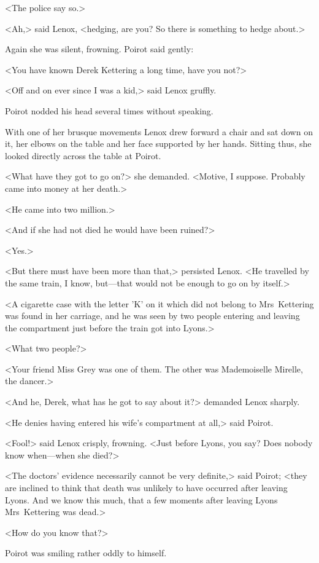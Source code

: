 <The police say so.>

<Ah,> said Lenox, <hedging, are you? So there is something to hedge about.>

Again she was silent, frowning. Poirot said gently:

<You have known Derek Kettering a long time, have you not?>

<Off and on ever since I was a kid,> said Lenox gruffly.

Poirot nodded his head several times without speaking.

With one of her brusque movements Lenox drew forward a chair and sat down on it, her elbows on the table and her face supported by her hands. Sitting thus, she looked directly across the table at Poirot.

<What have they got to go on?> she demanded. <Motive, I suppose. Probably came into money at her death.>

<He came into two million.>

<And if she had not died he would have been ruined?>

<Yes.>

<But there must have been more than that,> persisted Lenox. <He travelled by the same train, I know, but—that would not be enough to go on by itself.>

<A cigarette case with the letter 'K' on it which did not belong to Mrs~Kettering was found in her carriage, and he was seen by two people entering and leaving the compartment just before the train got into Lyons.>

<What two people?>

<Your friend Miss Grey was one of them. The other was Mademoiselle Mirelle, the dancer.>

<And he, Derek, what has he got to say about it?> demanded Lenox sharply.

<He denies having entered his wife's compartment at all,> said Poirot.

<Fool!> said Lenox crisply, frowning. <Just before Lyons, you say? Does nobody know when—when she died?>

<The doctors' evidence necessarily cannot be very definite,> said Poirot; <they are inclined to think that death was unlikely to have occurred after leaving Lyons. And we know this much, that a few moments after leaving Lyons Mrs~Kettering was dead.>

<How do you know that?>

Poirot was smiling rather oddly to himself.

